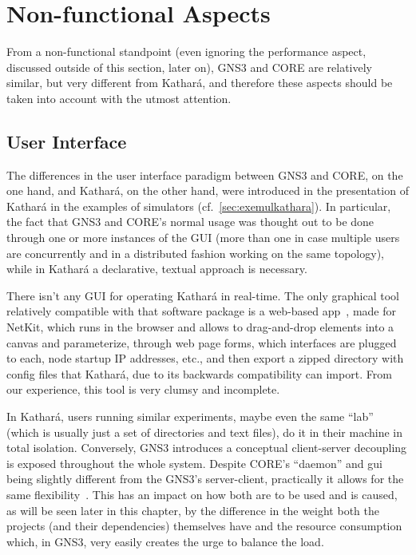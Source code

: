 \section{Non-functional Aspects}
\label{sec:comparativenonfunctional}

From a non-functional standpoint (even ignoring the performance aspect, discussed outside of this section, later on), GNS3 and CORE are relatively similar, but very different from Kathará, and therefore these aspects should be taken into account with the utmost attention.

\subsection{User Interface}
\label{subsec:comparativeui}

The differences in the user interface paradigm between GNS3 and CORE, on the one hand, and Kathará, on the other hand, were introduced in the presentation of Kathará in the examples of simulators (cf.~\ref{sec:exemulkathara}).
In particular, the fact that GNS3 and CORE's normal usage was thought out to be done through one or more instances of the GUI (more than one in case multiple users are concurrently and in a distributed fashion working on the same topology), while in Kathará a declarative, textual approach is necessary.

There isn't any GUI for operating Kathará in real-time.
The only graphical tool relatively compatible with that software package is a web-based app~\cite{netkitlabgen}, made for NetKit, which runs in the browser and allows to drag-and-drop elements into a canvas and parameterize, through web page forms, which interfaces are plugged to each, node startup IP addresses, etc., and then export a zipped directory with config files that Kathará, due to its backwards compatibility can import.
From our experience, this tool is very clumsy and incomplete.

In Kathará, users running similar experiments, maybe even the same ``lab'' (which is usually just a set of directories and text files), do it in their machine in total isolation.
Conversely, GNS3 introduces a conceptual client-server decoupling is exposed throughout the whole system.
Despite CORE's ``daemon'' and \gls{gui} being slightly different from the GNS3's server-client, practically it allows for the same flexibility~\cite{coreghdocs}.
This has an impact on how both are to be used and is caused, as will be seen later in this chapter, by the difference in the weight both the projects (and their dependencies) themselves have and the resource consumption which, in GNS3, very easily creates the urge to balance the load.

